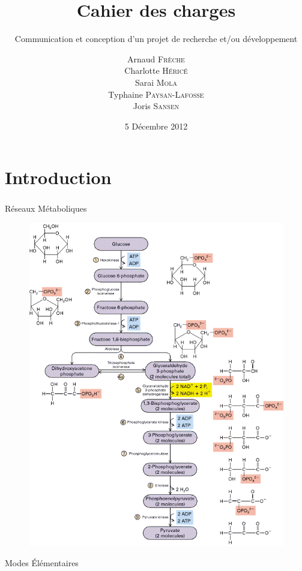 \documentclass[11pt]{beamer}
\title{\textbf{Cahier des charges}}
\subtitle{Communication et conception d'un projet de recherche et/ou développement}
\date{5 Décembre 2012}
\author{Arnaud \textsc{Frèche} \\ Charlotte \textsc{Héricé} \\ Sarai \textsc{Mola}\\ Typhaine  \textsc{Paysan-Lafosse} \\ Joris \textsc{Sansen}}
\institute[Université Bordeaux 1] {Master 2 BioInformatique}
\begin{document}
\frame{\titlepage}



\section{Introduction}			

\begin{frame}
	\frametitle{\secname}
	\begin{minipage}{6cm}
	Réseaux Métaboliques
	\begin{figure}[h]
		\begin{center}
   			\begin{minipage}[c]{0.9\textwidth}
  				\includegraphics[scale=0.2]{glycolyse.png}
			 \end{minipage}
  		\end{center}	
	\end{figure}
	\end{minipage}
	\begin{minipage}{4cm}
   		Modes Élémentaires
   		\newline


\end{minipage}
\end{frame}
\end{document}
